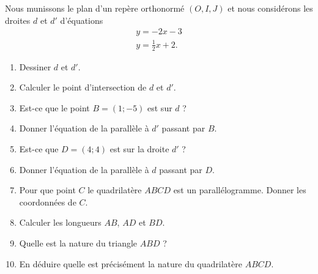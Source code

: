 
\begin{exercice}\label{exosmath-0000}

    Nous munissons le plan d'un repère orthonormé \( (O,I,J)\) et nous considérons les droites \( d\) et \( d'\) d'équations
    \begin{subequations}
        \begin{align}
            y=-2x-3\\
            y=\frac{ 1 }{2}x+2.
        \end{align}
    \end{subequations}
    \begin{multicols}{2}
    \begin{enumerate}
        \item
            Dessiner \( d\) et \( d'\).
        \item
            Calculer le point d'intersection de \( d\) et \( d'\).
        \item
            Est-ce que le point \( B=(1;-5)\) est sur \( d\) ?
        \item
            Donner l'équation de la parallèle à \( d'\) passant par \( B\).
        \item
            Est-ce que \( D=(4;4)\) est sur la droite \( d'\) ?
        \item
            Donner l'équation de la parallèle à \( d\) passant par \( D\).
        \item
            Pour que point \( C\) le quadrilatère \( ABCD\) est un parallélogramme. Donner les coordonnées de \( C\).
        \item
            Calculer les longueurs \( AB\), \( AD\) et \( BD\).
        \item
            Quelle est la nature du triangle \( ABD\) ?
        \item
            En déduire quelle est précisément la nature du quadrilatère \( ABCD\).
    \end{enumerate}
    \end{multicols}

\end{exercice}
